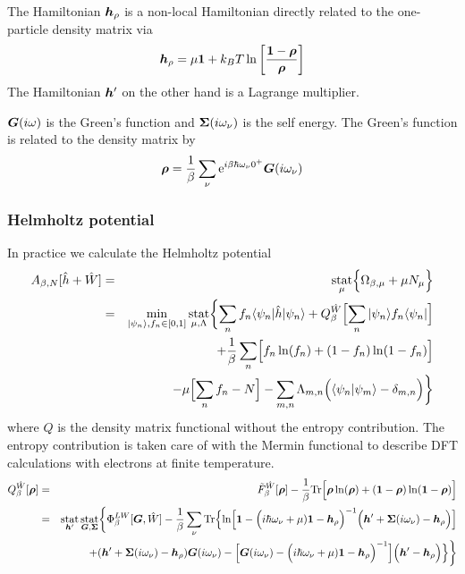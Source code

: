 \documentclass[11pt,a4paper]{report}
\begin{document}
The Hamiltonian $\bm{h}_\rho$ is a non-local Hamiltonian directly
related to the one-particle density matrix via
\begin{eqnarray}
\bm{h}_\rho=\mu\bm{1}+k_BT\ln
\left[\frac{\bm{1}-\bm{\rho}}{\bm{\rho}}\right]
\end{eqnarray}
The Hamiltonian $\bm{h}'$ on the other hand is a Lagrange multiplier.

$\bm{G}(i\omega)$ is the Green's function and $\bm{\Sigma}(i\omega_\nu)$
is the self energy. The Green's function is related to the density matrix by
\begin{eqnarray}
\bm{\rho}=\frac{1}{\beta}
\sum_\nu\mathrm{e}^{i\beta\hbar\omega_\nu0^+}\bm{G}(i\omega_\nu)
\label{eq:rhoofg}
\end{eqnarray}



\subsubsection{Helmholtz potential}
In practice we calculate the Helmholtz potential
\begin{eqnarray}
A_{\beta,N}[\hat{h}+\hat{W}]
&=&\operatorname*{stat}_\mu\Bigl\lbrace\Omega_{\beta,\mu}+\mu N_\mu\Bigr\rbrace
\nonumber\\
&=&\min_{|\psi_n\rangle,f_n\in[0,1]}\operatorname*{stat}_{\mu,\Lambda}
\biggl\lbrace\sum_n f_n\langle\psi_n|\hat{h}|\psi_n\rangle
+Q_\beta^{\hat{W}}\Bigl[\sum_n|\psi_n\rangle f_n\langle\psi_n|\Bigr]
\nonumber\\
&&+\frac{1}{\beta}\sum_n\Bigl[f_n\ln(f_n)+(1-f_n)\ln(1-f_n)\Bigr]
\nonumber\\
&&
-\mu\Bigl[\sum_n f_n-N\Bigr]
-\sum_{m,n}\Lambda_{m,n}\Bigl(\langle\psi_n|\psi_m\rangle-\delta_{m,n}\Bigr)
\biggr\rbrace
\label{eq:hp}
\end{eqnarray}
where $Q$ is the density matrix functional without the entropy
contribution.  The entropy contribution is taken care of with the
Mermin functional to describe DFT calculations with electrons at
finite temperature.
\begin{eqnarray}
Q^{\hat{W}}_\beta[\bm{\rho}]
&=&\tilde{F}^{\hat{W}}_\beta[\bm{\rho}]
-
\frac{1}{\beta}\mathrm{Tr}\Bigl[
\bm{\rho}\ln(\bm{\rho})+(\bm{1}-\bm{\rho})\ln(\bm{1}-\bm{\rho})\Bigr]
\nonumber\\
&=&
\operatorname*{stat}_{\bm{h}'}\operatorname*{stat}_{\bm{G},\bm{\Sigma}}
\biggl\lbrace
\Phi^{LW}_\beta[\bm{G},\hat{W}]
-\frac{1}{\beta}\sum_\nu\mathrm{Tr}\Bigl\lbrace
\ln\Bigl[
\bm{1}-
\Bigl(i\hbar\omega_\nu+\mu)\bm{1}-\bm{h}_{\rho}\Bigr)^{-1}
\Bigl(\bm{h}'+\bm{\Sigma}(i\omega_\nu)-\bm{h}_{\rho}\Bigr)
\Bigr]
\nonumber\\&&
+(\bm{h}'+\bm{\Sigma}(i\omega_\nu)-\bm{h}_\rho)\bm{G}(i\omega_\nu)
-
\Bigl[
\bm{G}(i\omega_\nu)
-\Bigl(i\hbar\omega_\nu+\mu)\bm{1}-\bm{h}_{\rho}\Bigr)^{-1}
\Bigr]
\Bigl(\bm{h}'-\bm{h}_\rho\Bigr)\Bigr\rbrace
\biggr\rbrace
\label{eq:dmfQgreen}
\end{eqnarray}
\end{document}
